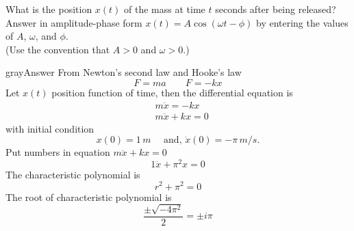 What is the position $x(t)$ of the mass at time $t$ seconds after being released?
Answer in amplitude-phase form $x(t) = A \cos⁡ (\omega t - \phi)$ by entering the values of
$A$, $\omega$, and $\phi$.\\

(Use the convention that $ A > 0$ and $\omega > 0$.)

\begin{mybox}{gray}{Answer}
  From Newton's second law and Hooke's law
  \begin{equation*}
    F = ma \qquad F = -kx
  \end{equation*}
  Let $x(t)$ position function of time, then the differential equation is 
  \begin{align*}
    &m \ddot{x} = -kx \\
    &m \ddot{x} + kx = 0
  \end{align*}
  with initial condition
  \begin{equation*}
    x(0) = 1 \,m \quad \text{ and, } \dot{x}(0) = - \pi\, m/s .
  \end{equation*}
  Put numbers in equation $m \ddot{x} + kx = 0$
  \begin{equation*}
    1 \ddot{x} + \pi^2 x = 0 
  \end{equation*}
  The characteristic polynomial is
  \begin{equation*}
    r^2 + \pi^2 = 0 
  \end{equation*}
  The root of characteristic polynomial is
  \begin{equation*}
    \frac{\pm \sqrt{-4 \pi^2}}{2} = \pm i \pi
  \end{equation*}
\end{mybox}

